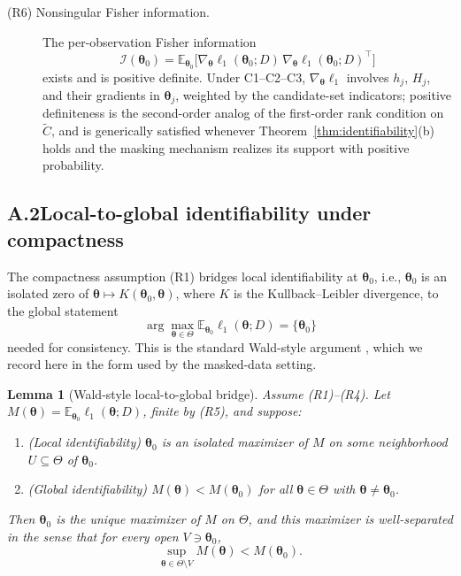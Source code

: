 \documentclass[11pt]{article}
\theoremstyle{definition}
\theoremstyle{plain}
\newtheorem{lemma}{Lemma}
\renewcommand{\v}[1]{\boldsymbol{#1}}
\newcommand{\E}{\mathbb{E}}
\begin{document}
\begin{description}
    \item[(R6) Nonsingular Fisher information.] The per-observation
    Fisher information
    \[
    \mathcal{I}(\v{\theta}_0) = \E_{\v{\theta}_0}\!\bigl[
        \nabla_{\v{\theta}} \ell_1(\v{\theta}_0; D)
        \,
        \nabla_{\v{\theta}} \ell_1(\v{\theta}_0; D)^{\top}
    \bigr]
    \]
    exists and is positive definite. Under C1--C2--C3,
    $\nabla_{\v{\theta}} \ell_1$ involves $h_j$, $H_j$, and their
    gradients in $\v{\theta}_j$, weighted by the candidate-set indicators;
    positive definiteness is the second-order analog of the
    first-order rank condition on $\tilde C$, and is generically
    satisfied whenever Theorem~\ref{thm:identifiability}(b) holds
    and the masking mechanism realizes its support with positive
    probability.
\end{description}

\subsection*{A.2\quad Local-to-global identifiability under compactness}

The compactness assumption (R1) bridges local identifiability at
$\v{\theta}_0$, i.e., $\v{\theta}_0$ is an isolated zero of
$\v{\theta} \mapsto K(\v{\theta}_0, \v{\theta})$, where $K$ is the
Kullback--Leibler divergence, to the global statement
\begin{equation*}
    \arg\max_{\v{\theta} \in \Theta}
    \E_{\v{\theta}_0}\!\ell_1(\v{\theta}; D) = \{\v{\theta}_0\}
\end{equation*}
needed for consistency. This
is the standard Wald-style argument
\citep{wald1949,vandervaart1998asymptotic}, which we record here in
the form used by the masked-data setting.

\begin{lemma}[Wald-style local-to-global bridge]
\label{lem:wald-bridge}
Assume (R1)--(R4). Let
$M(\v{\theta}) = \E_{\v{\theta}_0} \ell_1(\v{\theta}; D)$, finite by
(R5), and suppose:
\begin{enumerate}
    \item[(i)] (Local identifiability) $\v{\theta}_0$ is an
    isolated maximizer of $M$ on some neighborhood
    $U \subseteq \Theta$ of $\v{\theta}_0$.
    \item[(ii)] (Global identifiability) $M(\v{\theta}) <
    M(\v{\theta}_0)$ for all $\v{\theta} \in \Theta$ with
    $\v{\theta} \neq \v{\theta}_0$.
\end{enumerate}
Then $\v{\theta}_0$ is the unique maximizer of $M$ on $\Theta$, and
this maximizer is well-separated in the sense that for every open
$V \ni \v{\theta}_0$,
\[
    \sup_{\v{\theta} \in \Theta \setminus V} M(\v{\theta}) <
    M(\v{\theta}_0).
\]
\end{lemma}
\end{document}
